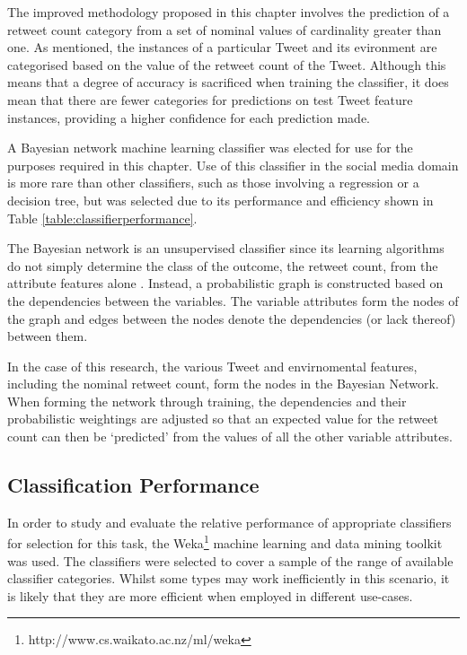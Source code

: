 The improved methodology proposed in this chapter involves the prediction of a retweet count category from a set of nominal values of cardinality greater than one. As mentioned, the instances of a particular Tweet and its evironment are categorised based on the value of the retweet count of the Tweet. Although this means that a degree of accuracy is sacrificed when training the classifier, it does mean that there are fewer categories for predictions on test Tweet feature instances, providing a higher confidence for each prediction made.

A Bayesian network machine learning classifier was elected for use for the purposes required in this chapter. Use of this classifier in the social media domain is more rare than other classifiers, such as those involving a regression or a decision tree, but was selected due to its performance and efficiency shown in Table \ref{table:classifierperformance}.  

The Bayesian network is an unsupervised classifier since its learning algorithms do not simply determine the class of the outcome, the retweet count, from the attribute features alone \cite{friedman97}. Instead, a probabilistic graph is constructed based on the dependencies between the variables. The variable attributes form the nodes of the graph and edges between the nodes denote the dependencies (or lack thereof) between them.

In the case of this research, the various Tweet and envirnomental features, including the nominal retweet count, form the nodes in the Bayesian Network. When forming the network through training, the dependencies and their probabilistic weightings are adjusted so that an expected value for the retweet count can then be `predicted' from the values of all the other variable attributes.


\subsection{Classification Performance}
\label{section:classification_performance}
In order to study and evaluate the relative performance of appropriate classifiers for selection for this task, the Weka\footnote{http://www.cs.waikato.ac.nz/ml/weka} machine learning and data mining toolkit was used. The classifiers were selected to cover a sample of the range of available classifier categories. Whilst some types may work inefficiently in this scenario, it is likely that they are more efficient when employed in different use-cases.

